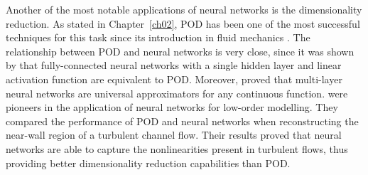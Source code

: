 Another of the most notable applications of neural networks is the dimensionality reduction.
As stated in Chapter~\ref{ch02}, POD has been one of the most successful techniques for this task since its introduction in fluid mechanics \citep{lumley1967structure}.
The relationship between POD and neural networks is very close, since it was shown by \citet{baldi1989neural} that fully-connected neural networks with a single hidden layer and linear activation function are equivalent to POD.
Moreover, \citet{hornik1989multilayer} proved that multi-layer neural networks are universal approximators for any continuous function.
\citet{milano2002neural} were pioneers in the application of neural networks for low-order modelling.
They compared the performance of POD and neural networks when reconstructing the near-wall region of a turbulent channel flow.
Their results proved that neural networks are able to capture the nonlinearities present in turbulent flows, thus providing better dimensionality reduction capabilities than POD.

